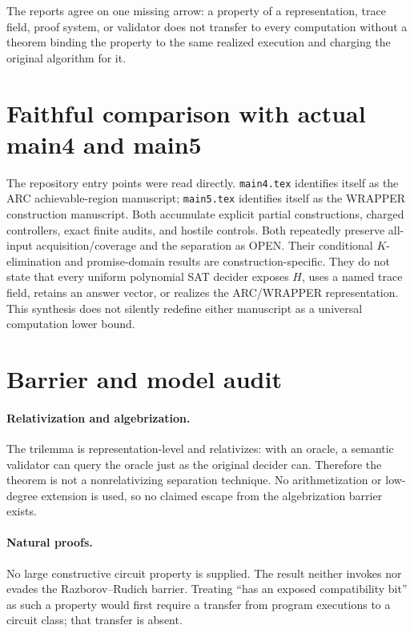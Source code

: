 \documentclass[11pt]{article}
\begin{document}
The reports agree on one missing arrow: a property of a representation,
trace field, proof system, or validator does not transfer to every computation
without a theorem binding the property to the same realized execution and
charging the original algorithm for it.

\section*{Faithful comparison with actual main4 and main5}
The repository entry points were read directly.  \texttt{main4.tex} identifies
itself as the ARC achievable-region manuscript; \texttt{main5.tex} identifies
itself as the WRAPPER construction manuscript.  Both accumulate explicit
partial constructions, charged controllers, exact finite audits, and hostile
controls.  Both repeatedly preserve all-input acquisition/coverage and the
separation as OPEN.  Their conditional $K$-elimination and promise-domain
results are construction-specific.  They do not state that every uniform
polynomial SAT decider exposes $H$, uses a named trace field, retains an answer
vector, or realizes the ARC/WRAPPER representation.  This synthesis does not
silently redefine either manuscript as a universal computation lower bound.

\section*{Barrier and model audit}
\paragraph{Relativization and algebrization.}
The trilemma is representation-level and relativizes: with an oracle, a
semantic validator can query the oracle just as the original decider can.
Therefore the theorem is not a nonrelativizing separation technique.  No
arithmetization or low-degree extension is used, so no claimed escape from the
algebrization barrier exists.

\paragraph{Natural proofs.}
No large constructive circuit property is supplied.  The result neither
invokes nor evades the Razborov--Rudich barrier.  Treating ``has an exposed
compatibility bit'' as such a property would first require a transfer from
program executions to a circuit class; that transfer is absent.
\end{document}
